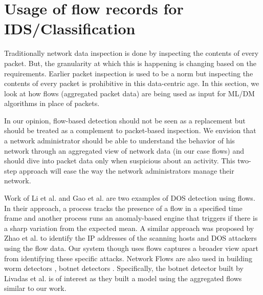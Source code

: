 \section{Usage of flow records for IDS/Classification}

Traditionally network data inspection is done by inspecting the contents of every packet. But, the granularity at which this is happening is changing based on the requirements. Earlier packet inspection is used to be a norm but inspecting the contents of every packet is prohibitive in this data-centric age. In this section, we look at how flows (aggregated packet data) are being used as input for ML/DM algorithms in place of packets.

In our opinion, flow-based detection should not be seen as a replacement but should be treated as a complement to packet-based inspection. We envision that a network administrator should be able to understand the behavior of his network through an aggregated view of network data (in our case flows) and should dive into packet data only when suspicious about an activity. This two-step approach will ease the way the network administrators manage their network.

Work of Li et al. \cite{gao2005towards} and Gao et al. \cite{gao2006resilient} are two examples of DOS detection using flows. In their approach, a process tracks the presence of a flow in a specified time frame and another process runs an anomaly-based engine that triggers if there is a sharp variation from the expected mean. A similar approach was proposed by Zhao et al.\cite{zhao2006detection} to identify the IP addresses of the scanning hosts and DOS attackers using the flow data. Our system though uses flows captures a broader view apart from identifying these specific attacks. Network Flows are also used in building worm detectors \cite{dubendorfer2005framework} \cite{diibendorfer2005host}, botnet detectors \cite{strayer2008botnet} \cite{livadas2006usilng} \cite{karasaridis2007wide}. Specifically, the botnet detector built by Livadas et al.  \cite{livadas2006usilng} is of interest as they built a model using the aggregated flows similar to our work.